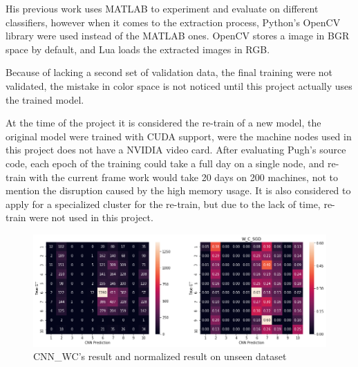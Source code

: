 \documentclass[bsc,logo,twoside,fullspacing,parskip]{infthesis}
\begin{document}
His previous work uses MATLAB to experiment and evaluate on different classifiers, however  when it comes to the extraction process, Python's OpenCV library were used instead of the MATLAB ones.
OpenCV stores a image in BGR space by default, and Lua loads the extracted images in RGB.

Because of lacking a second set of validation data, the final training were not validated, the mistake in color space is not noticed until this project actually uses the trained model.

At the time of the project it is considered the re-train of a new model, the original model were trained with CUDA support, were the machine nodes used in this project does not have a NVIDIA video card. 
After evaluating Pugh's source code, each epoch of the training could take a full day on a single node, and re-train with the current frame work would take 20 days on 200 machines, not to mention the disruption caused by the high memory usage. 
It is also considered to apply for a specialized cluster for the re-train, but due to the lack of time, re-train were not used in this project.

\begin{figure}[h]
\centering
    \includegraphics[scale=0.44]{graph/cnnwc.png}
    \caption{CNN\_WC's result and normalized result on unseen dataset}
    \label{fig:cnnbcacc}
\end{figure} 


\end{document}

